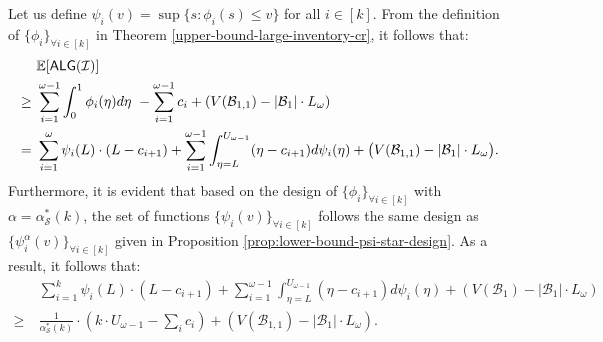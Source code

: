 Let us define $\psi_{i}(v) = \sup\{s: \phi_{i}(s) \leq v\}$ for all $i \in [k]$. From the definition of $\{\phi_{i}\}_{\forall i \in [k]}$ in Theorem \ref{upper-bound-large-inventory-cr}, it follows that:
\begin{align*}
    & \mathbb{E}[\textsf{ALG}(\mathcal{I})] \\
    \ge\ & \sum_{i=1}^{\omega-1} \int_{0}^{1} \phi_i(\eta) d\eta \  - \sum_{i=1}^{\omega-1} c_{i} + \left(V(\mathcal{B}_{1,1}) - |\mathcal{B}_{1}| \cdot L_{\omega} \right)  \\
  =\ & \sum_{i=1}^{\omega} \psi_{i}(L) \cdot (L - c_{i+1})+ \sum_{i=1}^{\omega-1} \int_{\eta =L}^{U_{\omega-1}} (\eta - c_{i+1} )d\psi_{i}(\eta) + \big(V(\mathcal{B}_{1,1}) - |\mathcal{B}_{1}| \cdot L_{\omega}\big).
\end{align*}
Furthermore, it is evident that based on  the design of $\{\phi_{i}\}_{\forall i \in [k]}$ with $\alpha = \alpha_{\mathcal{S}}^*(k)$, the set of functions $\{\psi_{i}(v)\}_{\forall i \in [k]}$ follows the same design as $\{\psi_{i}^{\alpha}(v)\}_{\forall i \in [k]}$ given in Proposition \ref{prop:lower-bound-psi-star-design}. As a result, it follows that:
\begin{align*}
    & \sum_{i=1}^{k} \psi_{i}(L) \cdot (L - c_{i+1}) + \sum_{i=1}^{\omega-1} \int_{\eta =L}^{U_{\omega-1}} (\eta - c_{i+1} )d\psi_{i}(\eta) + (V(\mathcal{B}_{1}) - |\mathcal{B}_{1}| \cdot L_{\omega}) \\
     \ge\ &  \frac{1}{\alpha_{\mathcal{S}}^*(k)} \cdot \left(k \cdot U_{\omega-1} - \sum_{i} c_{i} \right) + \left(V(\mathcal{B}_{1,1}) - |\mathcal{B}_{1}| \cdot L_{\omega} \right).
\end{align*}

